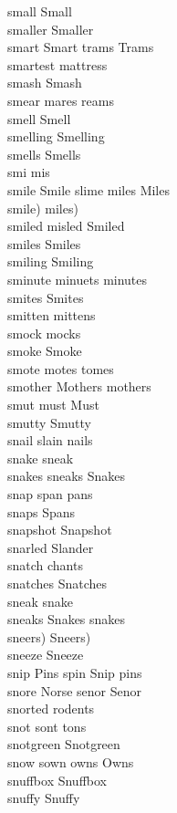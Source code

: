 small Small\\
smaller Smaller\\
smart Smart trams Trams\\
smartest mattress\\
smash Smash\\
smear mares reams\\
smell Smell\\
smelling Smelling\\
smells Smells\\
smi mis\\
smile Smile slime miles Miles\\
smile) miles)\\
smiled misled Smiled\\
smiles Smiles\\
smiling Smiling\\
sminute minuets minutes\\
smites Smites\\
smitten mittens\\
smock mocks\\
smoke Smoke\\
smote motes tomes\\
smother Mothers mothers\\
smut must Must\\
smutty Smutty\\
snail slain nails\\
snake sneak\\
snakes sneaks Snakes\\
snap span pans\\
snaps Spans\\
snapshot Snapshot\\
snarled Slander\\
snatch chants\\
snatches Snatches\\
sneak snake\\
sneaks Snakes snakes\\
sneers) Sneers)\\
sneeze Sneeze\\
snip Pins spin Snip pins\\
snore Norse senor Senor\\
snorted rodents\\
snot sont tons\\
snotgreen Snotgreen\\
snow sown owns Owns\\
snuffbox Snuffbox\\
snuffy Snuffy\\
